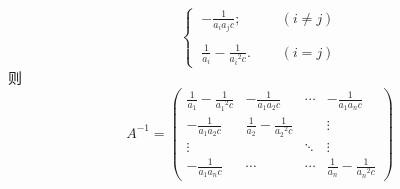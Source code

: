 \documentclass{article}
\begin{document}
\begin{enumerate}
\begin{enumerate}
\begin{enumerate}
\[                \begin{cases}
                    \ \displaystyle{-\frac{1}{a_i a_j c}}; \qquad &(i\neq j)\\
                    &\\
                    \ \displaystyle{\frac{1}{a_i}-\frac{1}{{a_i}^2 c}}. \quad &(i=j)
                \end{cases}
            \]
            则
            \[
                A^{-1}=
                \begin{pmatrix}
                    \displaystyle{\frac{1}{a_1}-\frac{1}{{a_1}^2 c}} & -\displaystyle{\frac{1}{a_1 a_2 c}} & \cdots & -\displaystyle{\frac{1}{a_1 a_n c}}\\
                    -\displaystyle{\frac{1}{a_1 a_2 c}} & \displaystyle{\frac{1}{a_2}-\frac{1}{{a_2}^2 c}} & & \vdots\\
                    \vdots & & \ddots & \vdots\\
                    -\displaystyle{\frac{1}{a_1 a_n c}} & \cdots & \cdots & \displaystyle{\frac{1}{a_n}-\frac{1}{{a_n}^2 c}}
                \end{pmatrix}
            \]
        \end{enumerate}
    \end{enumerate}    
\end{enumerate}
\end{document}
